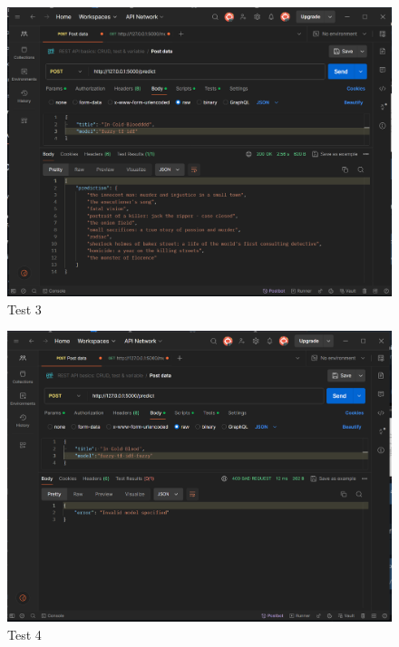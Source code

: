\begin{figure}[htbp]
    \centering
    \includegraphics[width=1\textwidth]{../../assets/test_3.png}
    \caption{Test 3}
    \label{fig:test3}
\end{figure}
\begin{figure}[htbp]
    \centering
    \includegraphics[width=1\textwidth]{../../assets/test_4.png}
    \caption{Test 4}
    \label{fig:test4}
\end{figure}
